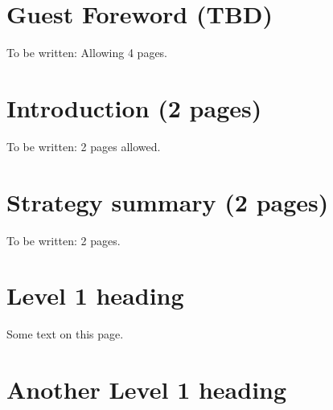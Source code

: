 \documentclass{article}
\begin{document}
	
	\section*{Guest Foreword (TBD)}
	To be written: Allowing 4 pages.
	\newpage 
	\setcounter{page}{5}
	
	\section*{Introduction (2 pages)}
	To be written: 2 pages allowed.
	\newpage
	\addtocounter{page}{1}
	
	\section*{Strategy summary (2 pages)}
	To be written: 2 pages.
	\newpage
	
	\tableofcontents
	
	\newpage
	
	\section{Level 1 heading}
	Some text on this page.
	\newpage
	\section{Another Level 1 heading}
\end{document}
